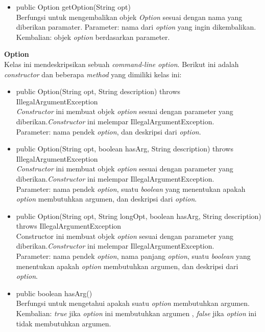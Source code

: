 \documentclass[a4paper,twoside]{article}
\begin{document}
\begin{enumerate}
\begin{itemize}
\item public Option getOption(String opt)\\
Berfungsi untuk mengembalikan objek \textit{Option} sesuai dengan nama yang diberikan paramater. 
Parameter: nama dari \textit{option} yang ingin dikembalikan.\\
Kembalian: objek \textit{option} berdasarkan parameter.

\end{itemize}


\textbf{Option}\\
Kelas ini mendeskripsikan sebuah \textit{command-line option}. Berikut ini adalah \textit{constructor} dan beberapa \textit{method} yang dimiliki kelas ini: 
\begin{itemize}
\item public Option(String opt, String description) throws IllegalArgumentException\\
\textit{Constructor} ini membuat objek \textit{option} sesuai dengan parameter yang diberikan.\textit{Constructor} ini melempar IllegalArgumentException.\\
Parameter: nama pendek \textit{option}, dan deskripsi dari \textit{option}.
\item public Option(String opt, boolean hasArg, String description) throws IllegalArgumentException\\
\textit{Constructor} ini membuat objek \textit{option} sesuai dengan parameter yang diberikan.\textit{Constructor} ini melempar IllegalArgumentException.\\
Parameter: nama pendek \textit{option}, suatu \textit{boolean} yang menentukan apakah \textit{option} membutuhkan argumen, dan deskripsi dari \textit{option}.
\item public Option(String opt, String longOpt, boolean hasArg, String description) throws IllegalArgumentException\\
{Constructor} ini membuat objek \textit{option} sesuai dengan parameter yang diberikan.\textit{Constructor} ini melempar IllegalArgumentException.\\
Parameter: nama pendek \textit{option}, nama panjang \textit{option}, suatu \textit{boolean} yang menentukan apakah \textit{option} membutuhkan argumen, dan deskripsi dari \textit{option}.
\item public boolean hasArg()\\
Berfungsi untuk mengetahui apakah suatu \textit{option} membutuhkan argumen.\\
Kembalian: \textit{true} jika \textit{option} ini membutuhkan argumen , \textit{false} jika \textit{option} ini tidak membutuhkan argumen.

\end{itemize}
\end{enumerate}
\end{document}
